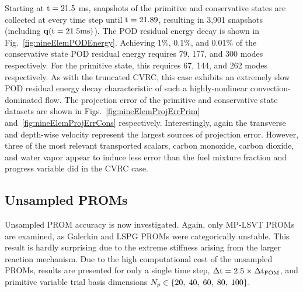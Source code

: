 Starting at $\text{t} = 21.5$ ms, snapshots of the primitive and conservative states are collected at every time step until $\text{t} = 21.89$, resulting in 3,901 snapshots (including $\mathbf{q}(\text{t} = 21.5 \text{ms})$). The POD residual energy decay is shown in Fig.~\ref{fig:nineElemPODEnergy}. Achieving 1\%, 0.1\%, and 0.01\% of the conservative state POD residual energy requires 79, 177, and 300 modes respectively. For the primitive state, this requires 67, 144, and 262 modes respectively. As with the truncated CVRC, this case exhibits an extremely slow POD residual energy decay characteristic of such a highly-nonlinear convection-dominated flow. The projection error of the primitive and conservative state datasets are shown in Figs.~\ref{fig:nineElemProjErrPrim} and~\ref{fig:nineElemProjErrCons} respectively. Interestingly, again the transverse and depth-wise velocity represent the largest sources of projection error. However, three of the most relevant transported scalars, carbon monoxide, carbon dioxide, and water vapor appear to induce less error than the fuel mixture fraction and progress variable did in the CVRC case.

\subsection{Unsampled PROMs}

Unsampled PROM accuracy is now investigated. Again, only MP-LSVT PROMs are examined, as Galerkin and LSPG PROMs were categorically unstable. This result is hardly surprising due to the extreme stiffness arising from the larger reaction mechanism. Due to the high computational cost of the unsampled PROMs, results are presented for only a single time step, $\Delta \text{t} = 2.5 \times \Delta \text{t}_{\text{FOM}}$, and primitive variable trial basis dimensions $N_p \in \{20, \; 40, \; 60, \; 80, \; 100\}$. 

